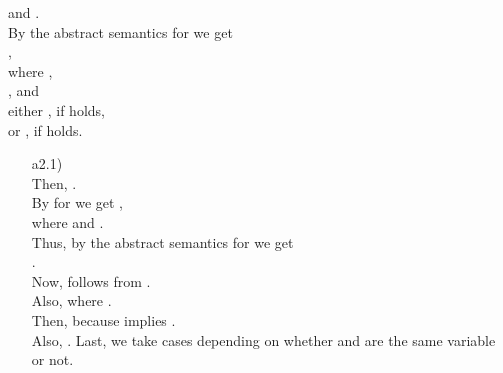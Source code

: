 \documentclass{LMCS}
\theoremstyle{definition} \newtheorem{property}[thm]{Property}
\begin{document}
\begin{enumerate}[]
\begin{enumerate}[]
            and . \\
            By the abstract semantics for  we get \\
            , \\
            where ,\\
            ,
             and \\
either , 
            if  holds, \\
            or ,
            if  holds.
            \begin{enumerate}[]
            \item[a2.1)]
               \\
              Then,
              \mbox{.} \\
              By \ih{} for  we get 
              , \\
              where  
              and . \\
              Thus, by the abstract semantics for 
              we get \\
              . \\
              Now,  follows from . \\
              Also,  
              where . \\
              Then, 
              because  implies . \\
              Also, . 
              Last, we take cases depending on whether  and  are the
              same variable or not.
              \begin{enumerate}[]
              \item[]
                 \\
                 
                 
                 
                
                
                
              \item[]
                 \\
                

\end{enumerate}
\end{enumerate}
\end{enumerate}
\end{enumerate}
\end{document}
